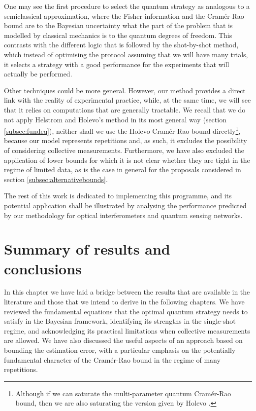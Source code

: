 One may see the first procedure to select the quantum strategy as analogous to a semiclassical approximation, where the Fisher information and the Cram\'{e}r-Rao bound are to the Bayesian uncertainty what the part of the problem that is modelled by classical mechanics is to the quantum degrees of freedom. This contrasts with the different logic that is followed by the shot-by-shot method, which instead of optimising the protocol assuming that we will have many trials, it selects a strategy with a good performance for the experiments that will actually be performed. 

Other techniques could be more general. However, our method provides a direct link with the reality of experimental practice, while, at the same time, we will see that it relies on computations that are generally tractable. We recall that we do not apply Helstrom and Holevo's method in its most general way (section \ref{subsec:fundeq}), neither shall we use the Holevo Cram\'{e}r-Rao bound directly\footnote{Although if we can saturate the multi-parameter quantum Cram\'{e}r-Rao bound, then we are also saturating the version given by Holevo \cite{sammy2016compatibility}.}, because our model represents repetitions and, as such, it excludes the possibility of considering collective measurements. Furthermore, we have also excluded the application of lower bounds for which it is not clear whether they are tight in the regime of limited data, as is the case in general for the proposals considered in section \ref{subsec:alternativebounds}.

The rest of this work is dedicated to implementing this programme, and its potential application shall be illustrated by analysing the performance predicted by our methodology for optical interferometers and quantum sensing networks. 

\section{Summary of results and conclusions}

In this chapter we have laid a bridge between the results that are available in the literature and those that we intend to derive in the following chapters. We have reviewed the fundamental equations that the optimal quantum strategy needs to satisfy in the Bayesian framework, identifying its strengths in the single-shot regime, and acknowledging its practical limitations when collective measurements are allowed. We have also discussed the useful aspects of an approach based on bounding the estimation error, with a particular emphasis on the potentially fundamental character of the Cram\'{e}r-Rao bound in the regime of many repetitions.  

